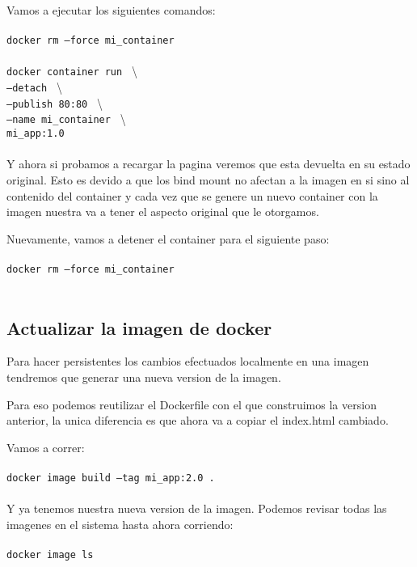 \documentclass[11pt]{article} %
\begin{document}
Vamos a ejecutar los siguientes comandos: \\ \\
	\texttt{docker rm --force mi\_container} \\ \\
	\texttt{docker container run } \textbackslash \\
	\texttt{--detach } \textbackslash \\
	\texttt{--publish 80:80 } \textbackslash \\
	\texttt{--name mi\_container } \textbackslash \\
	\texttt{mi\_app:1.0} \\ \\

Y ahora si probamos a recargar la pagina veremos que esta devuelta en su estado original. Esto es devido a que los bind mount no afectan a la imagen en si sino al contenido del container y cada vez que se genere un nuevo container con la imagen nuestra va a tener el aspecto original que le otorgamos.

Nuevamente, vamos a detener el container para el siguiente paso: \\ \\
	\texttt{docker rm --force mi\_container} \\ \\

\subsection{Actualizar la imagen de docker}

Para hacer persistentes los cambios efectuados localmente en una imagen tendremos que generar una nueva version de la imagen.

Para eso podemos reutilizar el Dockerfile con el que construimos la version anterior, la unica diferencia es que ahora va a copiar el index.html cambiado.

Vamos a correr: \\ \\
	\texttt{docker image build --tag mi\_app:2.0 .} \\ \\

Y ya tenemos nuestra nueva version de la imagen. Podemos revisar todas las imagenes en el sistema hasta ahora corriendo: \\ \\
	\texttt{docker image ls} \\ \\
\end{document}
